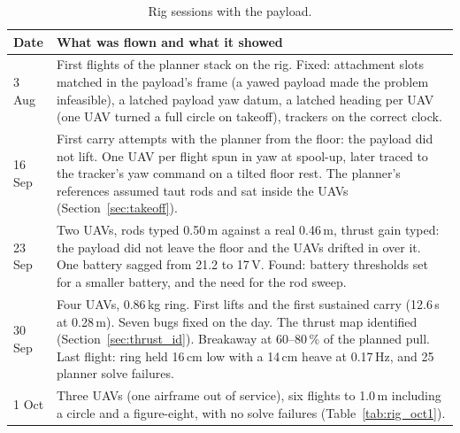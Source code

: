 \begin{table}[h]
\centering
\small
\caption{Rig sessions with the payload.}
\label{tab:rig_days}
\begin{tabularx}{\textwidth}{lX}
\toprule
Date & What was flown and what it showed \\
\midrule
3 Aug & First flights of the planner stack on the rig. Fixed: attachment slots matched in the
payload's frame (a yawed payload made the problem infeasible), a latched payload yaw datum, a latched
heading per UAV (one UAV turned a full circle on takeoff), trackers on the correct clock. \\
16 Sep & First carry attempts with the planner from the floor: the payload did not lift. One UAV per
flight spun in yaw at spool-up, later traced to the tracker's yaw command on a tilted floor rest. The planner's references assumed taut rods and sat inside
the UAVs (Section~\ref{sec:takeoff}). \\
23 Sep & Two UAVs, rods typed 0.50\,m against a real 0.46\,m, thrust gain typed: the payload did not
leave the floor and the UAVs drifted in over it. One battery sagged from 21.2 to 17\,V. Found: battery
thresholds set for a smaller battery, and the need for the rod sweep. \\
30 Sep & Four UAVs, 0.86\,kg ring. First lifts and the first sustained carry (12.6\,s at 0.28\,m). Seven
bugs fixed on the day. The thrust map identified (Section~\ref{sec:thrust_id}). Breakaway at 60--80\,\%
of the planned pull. Last flight: ring held 16\,cm low with a 14\,cm heave at 0.17\,Hz, and 25 planner
solve failures. \\
1 Oct & Three UAVs (one airframe out of service), six flights to 1.0\,m including a circle and a
figure-eight, with no solve failures (Table~\ref{tab:rig_oct1}). \\
\bottomrule
\end{tabularx}
\end{table}

